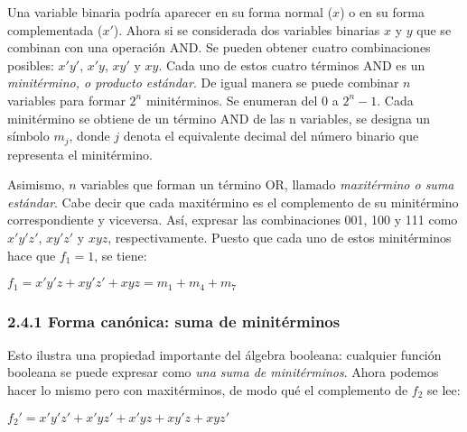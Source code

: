 \documentclass{article}
\begin{document}
Una variable binaria podr\'{i}a aparecer en su forma normal ($x$) o en su forma complementada
($x'$). Ahora si se considerada dos variables binarias $x$ y $y$ que se combinan con una operaci\'{o}n
AND. Se pueden obtener cuatro combinaciones posibles: $x'y'$, $x'y$, $xy'$ y $xy$. Cada uno de
estos cuatro t\'{e}rminos AND es un \textit{minit\'{e}rmino, o producto est\'{a}ndar}. De igual
manera se puede combinar $n$ variables para formar $2^n$ minit\'{e}rminos. Se enumeran del 0 a $2^n - 1$. 
Cada minit\'{e}rmino se obtiene de un t\'{e}rmino AND de las n variables, se designa un s\'{i}mbolo $m_j$,
donde $j$ denota el equivalente decimal del n\'{u}mero binario que representa el minit\'{e}rmino.

Asimismo, $n$ variables que forman un t\'{e}rmino OR, llamado \textit{maxit\'{e}rmino o suma est\'{a}ndar}.
Cabe decir que cada maxit\'{e}rmino es el complemento de su minit\'{e}rmino correspondiente y viceversa.
As\'{i}, expresar las combinaciones 001, 100 y 111 como $x'y'z'$, $xy'z'$ y $xyz$, respectivamente. Puesto 
que cada uno de estos minit\'{e}rminos hace que $f_1 = 1$, se tiene:
\begin{center}
    $f_1 = x'y'z + xy'z' + xyz = m_1 + m_4 + m_7$ 
\end{center}

\subsubsection*{2.4.1 Forma can\'{o}nica: suma de minit\'{e}rminos}
\begin{flushleft}
    Esto ilustra una propiedad importante del \'{a}lgebra booleana: cualquier funci\'{o}n booleana se puede
    expresar como \textit{una suma de minit\'{e}rminos}. Ahora podemos hacer lo mismo pero con maxit\'{e}rminos,
    de modo qu\'{e} el complemento de $f_2$ se lee:
\end{flushleft}
\begin{center}
    $f_2' = x'y'z' +x'yz' + x'yz + xy'z + xyz'$    
\end{center}
\end{document}
